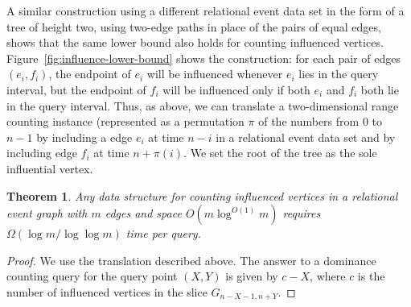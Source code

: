 \documentclass[11pt]{article}
\newtheorem{theorem}{Theorem}
\begin{document}
A similar construction using a different relational event data set in the form of a tree of height two, using two-edge paths in place of the pairs of equal edges, shows that the same lower bound also holds for counting influenced vertices. Figure~\ref{fig:influence-lower-bound} shows the construction: for each pair of edges $(e_i,f_i)$, the endpoint of $e_i$ will be influenced whenever $e_i$ lies in the query interval, but the endpoint of $f_i$ will be influenced only if both $e_i$ and $f_i$ both lie in the query interval. Thus, as above, we can translate a two-dimensional range counting instance (represented as a permutation $\pi$ of the numbers from $0$ to $n-1$ by including a edge $e_i$ at time $n-i$ in a relational event data set and by including edge $f_i$ at time $n+\pi(i)$. We set the root of the tree as the sole influential vertex.

\begin{theorem}
\label{thm:lb2}
Any data structure for counting influenced vertices in a relational event graph with $m$ edges and space $O(m\log^{O(1)} m)$ requires $\Omega(\log m/\log\log m)$ time per query.
\end{theorem}

\begin{proof}
We use the translation described above. The answer to a dominance counting query for the query point $(X,Y)$ is given by $c-X$, where $c$ is the number of influenced vertices in the slice $G_{n-X-1,n+Y}$.
\end{proof}
\end{document}
